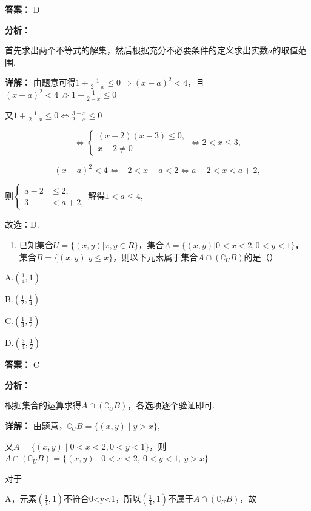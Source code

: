 \documentclass[11pt,a4paper]{ctexart}
\begin{document}
\textbf{答案：}
D

\textbf{分析：}

首先求出两个不等式的解集，然后根据充分不必要条件的定义求出实数\(a\)的取值范围.

\textbf{详解：}
由题意可得\(1+\frac{1}{2-x}\leq0\Rightarrow(x-a)^{2}<4\)，且\((x-a)^{2}<4 \not\Rightarrow 1+\frac{1}{2-x}\leq0\)

又\(1 + \frac{1}{2 - x}\leq 0\Leftrightarrow \frac{3 - x}{2 - x}\leq 0\)

\[
\Leftrightarrow \left\{ \begin{array}{l} (x - 2) (x - 3) \leq 0, \\ x - 2 \neq 0 \end{array} \right. \Leftrightarrow 2 <   x \leq 3,
\]

\[
(x - a) ^ {2} <   4 \Leftrightarrow - 2 <   x - a <   2 \Leftrightarrow a - 2 <   x <   a + 2,
\]

则\(\left\{\begin{aligned}a-2&\leq2,\\ 3&<a+2,\end{aligned}\right.\)解得\(1<a\leq4,\)

故选：D.

\begin{enumerate}[label=\arabic*., leftmargin=*, start=10]
\item 已知集合\(U = \{(x, y) | x, y \in R\}\)，集合\(A = \{(x, y) | 0 < x < 2, 0 < y < 1\}\)，集合\(B = \{(x, y) | y \leq x\}\)，则以下元素属于集合\(A \cap (\complement_U B)\)的是（）
\end{enumerate}

A.\(\left(\frac{1}{4},1\right)\)

B.\(\left(\frac{1}{2},\frac{1}{4}\right)\)

C.\(\left(\frac{1}{4},\frac{1}{2}\right)\)

D.\(\left(\frac{3}{4},\frac{1}{2}\right)\)

\textbf{答案：}
C

\textbf{分析：}

根据集合的运算求得\(A\cap(\complement_U B)\)，各选项逐个验证即可.

\textbf{详解：}
由题意，\(\complement_UB=\{(x,y)\mid y>x\}\),

又\(A=\{(x,y)\mid0<x<2,0<y<1\}\)，则\(A\cap(\complement_UB)=\{(x,y)\mid 0<x<2,\ 0<y<1,\ y>x\}\)

对于

A，元素\(\left(\frac{1}{4},1\right)\)不符合0\textless y\textless1，所以\(\left(\frac{1}{4},1\right)\)不属于\(A\cap(\complement_U B)\)，故
\end{document}

